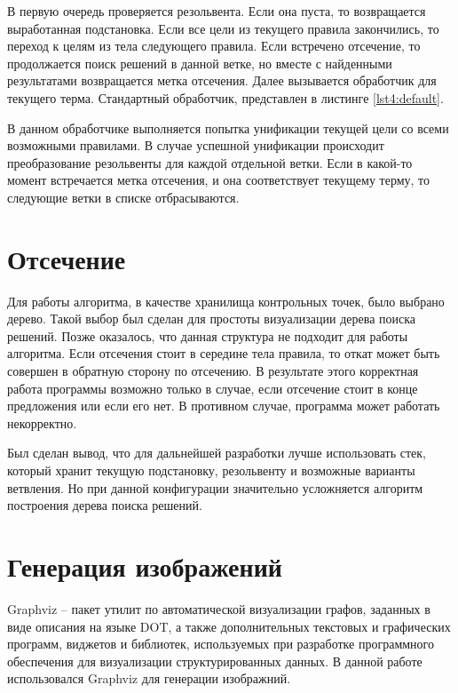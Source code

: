 В первую очередь проверяется резольвента. Если она пуста, то возвращается выработанная подстановка. Если все цели из текущего правила закончились, то переход к целям из тела следующего правила.
Если встречено отсечение, то продолжается поиск решений в данной ветке, но вместе с найденными результатами возвращается метка отсечения.
Далее вызывается обработчик для текущего терма. Стандартный обработчик, представлен в листинге \ref{lst4:default}.


В данном обработчике выполняется попытка унификации текущей цели со всеми возможными правилами. В случае успешной унификации происходит преобразование резольвенты для каждой отдельной ветки. Если в какой-то момент встречается метка отсечения, и она соответствует текущему терму, то следующие ветки в списке отбрасываются.

\section{Отсечение}
Для работы алгоритма, в качестве хранилища контрольных точек, было выбрано дерево. Такой выбор был сделан для простоты визуализации дерева поиска решений. Позже оказалось, что данная структура не подходит для работы алгоритма. Если отсечения стоит в середине тела правила, то откат может быть совершен в обратную сторону по отсечению. В результате этого корректная работа программы возможно только в случае, если отсечение стоит в конце предложения или если его нет. В противном случае, программа может работать некорректно. 

Был сделан вывод, что для дальнейшей разработки лучше использовать стек, который хранит текущую подстановку, резольвенту и возможные варианты ветвления. Но при данной конфигурации значительно усложняется алгоритм построения дерева поиска решений.

\section{Генерация изображений}
Graphviz -- пакет утилит по автоматической визуализации графов, заданных в виде описания на языке DOT, а также дополнительных текстовых и графических программ, виджетов и библиотек, используемых при разработке программного обеспечения для визуализации структурированных данных. В данной работе использовался Graphviz для генерации изображний.

